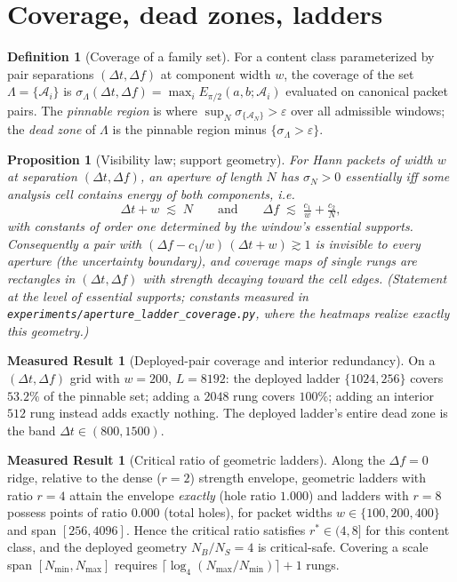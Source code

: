 \documentclass[11pt]{article}
\newtheorem{proposition}[theorem]{Proposition}
\theoremstyle{definition}
\newtheorem{definition}[theorem]{Definition}
\newtheorem{measured}[theorem]{Measured Result}
\newcommand{\cA}{\mathcal{A}}
\begin{document}
\section{Coverage, dead zones, ladders}\label{sec:coverage}

\begin{definition}[Coverage of a family set]
For a content class parameterized by pair separations
$(\Delta t,\Delta f)$ at component width $w$, the coverage of the set
$\Lambda=\{\cA_{i}\}$ is
$\sigma_{\Lambda}(\Delta t,\Delta f)=\max_{i}E_{\pi/2}(a,b;\cA_{i})$
evaluated on canonical packet pairs.  The \emph{pinnable region} is where
$\sup_{N}\sigma_{\{\cA_N\}}>\varepsilon$ over all admissible windows; the
\emph{dead zone} of $\Lambda$ is the pinnable region minus
$\{\sigma_{\Lambda}>\varepsilon\}$.
\end{definition}

\begin{proposition}[Visibility law; support geometry]\label{prop:visibility}
For Hann packets of width $w$ at separation $(\Delta t,\Delta f)$, an
aperture of length $N$ has $\sigma_N>0$ essentially iff some analysis cell
contains energy of both components, i.e.
\[
  \Delta t + w \;\lesssim\; N
  \qquad\text{and}\qquad
  \Delta f \;\lesssim\; \tfrac{c_1}{w}+\tfrac{c_2}{N},
\]
with constants of order one determined by the window's essential supports.
Consequently a pair with
$(\Delta f - c_1/w)\,(\Delta t + w)\gtrsim 1$ is invisible to \emph{every}
aperture (the uncertainty boundary), and coverage maps of single rungs are
rectangles in $(\Delta t,\Delta f)$ with strength decaying toward the cell
edges.  \textup{(Statement at the level of essential supports; constants
measured in \texttt{experiments/aperture\_ladder\_coverage.py}, where the
heatmaps realize exactly this geometry.)}
\end{proposition}

\begin{measured}[Deployed-pair coverage and interior redundancy]
On a $(\Delta t,\Delta f)$ grid with $w=200$, $L=8192$: the deployed ladder
$\{1024,256\}$ covers $53.2\%$ of the pinnable set; adding a $2048$ rung
covers $100\%$; adding an interior $512$ rung instead adds exactly nothing.
The deployed ladder's entire dead zone is the band
$\Delta t\in(800,1500)$.
\end{measured}

\begin{measured}[Critical ratio of geometric ladders]\label{meas:rstar}
Along the $\Delta f=0$ ridge, relative to the dense ($r=2$) strength
envelope, geometric ladders with ratio $r=4$ attain the envelope
\emph{exactly} (hole ratio $1.000$) and ladders with $r=8$ possess points
of ratio $0.000$ (total holes), for packet widths $w\in\{100,200,400\}$ and
span $[256,4096]$.  Hence the critical ratio satisfies $r^{*}\in(4,8]$ for
this content class, and the deployed geometry $N_B/N_S=4$ is critical-safe.
Covering a scale span $[N_{\min},N_{\max}]$ requires
$\lceil\log_{4}(N_{\max}/N_{\min})\rceil+1$ rungs.
\end{measured}
\end{document}
